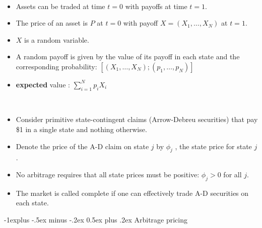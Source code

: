 \documentclass[10pt,landscape,a4paper]{article}
\makeatletter
\renewcommand{\subsection}{\@startsection{subsection}{2}{0mm}%
                                {-1explus -.5ex minus -.2ex}%
                                {0.5ex plus .2ex}%
                                {\normalfont\normalsize\bfseries}}
\makeatother
\begin{document}
\begin{multicols*}{3}
\begin{description}[itemsep=0pt]
	\item[State-space model] ~
	\begin{itemize}
		\item Assets can be traded at time $t = 0$ with payoffs at time $t = 1$.
		\item The price of an asset is $P$ at $t= 0$ with payoff $X=(X_1, \dots , X_N)$ at $t=1$.
		\item $X$ is a random variable.
		\item A random payoff is given by the value of	its payoff in each state and the corresponding probability:
		$[(X_1, \dots, X_N); (p_1, \dots , p_N)] $
		\item{\bf expected} value : $\sum_{i=1}^{N} p_i X_i$ 
	\end{itemize}
	\item[State Prices]~
	\begin{itemize}
		\item Consider primitive state-contingent claims (Arrow-Debreu securities) that pay \$1 in a	single state and nothing otherwise.
		\item Denote the price of the A-D claim on state $j$ by $\phi_j$ , the state price for state $j$.
		\item No arbitrage requires that all state prices must be positive: $\phi_j > 0$ for all $j$.
		\item The market is called complete if one can effectively trade A-D securities on each state.
	\end{itemize}	
\end{description}


\subsection{Arbitrage pricing}


\end{multicols*}
\end{document}
